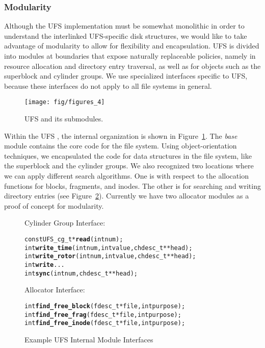 \subsubsection {Modularity}
Although the UFS implementation must be somewhat monolithic in order to
understand the interlinked UFS-specific disk structures, we would like to take
advantage of modularity to allow for flexibility and encapsulation. UFS is
divided into modules at boundaries that expose naturally replaceable policies,
namely in resource allocation and directory entry traversal, as well as for
objects such as the superblock and cylinder groups. We use specialized
interfaces specific to UFS, because these interfaces do not apply to all file
systems in general.

\begin{figure}[htb]
  \centering
  \texttt{[image: fig/figures\_4]}
  \caption{\label{fig:ufsmodules} UFS and its submodules.}
\end{figure}

Within the UFS \module, the internal organization is shown in
Figure~\ref{fig:ufsmodules}. The \emph{base} module contains the core code for
the file system. Using object-orientation techniques, we encapsulated the code
for data structures in the file system, like the superblock and the cylinder
groups. We also recognized two locations where we can apply different search
algorithms. One is with respect to the allocation functions for blocks,
fragments, and inodes. The other is for searching and writing directory entries
(see Figure~\ref{fig:moduleinterface}). Currently we have two allocator modules
as a proof of concept for modularity.

\begin{figure}[htb]
Cylinder Group Interface:
\vspace{-0.5\baselineskip}
\begin{scriptsize}
\begin{alltt}
const UFS_cg_t * \textbf{read}(int num);
int \textbf{write_time}(int num, int value, chdesc_t ** head);
int \textbf{write_rotor}(int num, int value, chdesc_t ** head);
int \textbf{write}...
int \textbf{sync}(int num, chdesc_t ** head);
\end{alltt}
\end{scriptsize}

Allocator Interface:
\vspace{-0.5\baselineskip}
\begin{scriptsize}
\begin{alltt}
int \textbf{find_free_block}(fdesc_t * file, int purpose);
int \textbf{find_free_frag}(fdesc_t * file, int purpose);
int \textbf{find_free_inode}(fdesc_t * file, int purpose);
\end{alltt}
\end{scriptsize}
\vspace{-0.5\baselineskip}
\caption{\label{fig:moduleinterface} Example UFS Internal Module Interfaces}
\end{figure}

